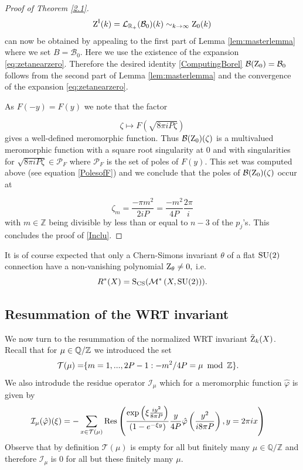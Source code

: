 \begin{proof}[Proof of Theorem \ref{2.1}]
  $$\operatorname{Z}^{\operatorname{I}}(k)= \mathcal{L}_{\mathbb{R}_+} (\mathcal{B}_0)(k) \sim_{k \rightarrow \infty}  \operatorname{Z}_0(k) $$ can now be obtained by appealing to the first part of Lemma \ref{lem:masterlemma} where we set $B=\mathcal{B}_0$. Here we use the existence of the expansion \eqref{eq:zetanearzero}. Therefore the desired identity  \eqref{ComputingBorel}  $\mathcal{B}(\operatorname{Z}_0)=\mathcal{B}_0$ follows from the second part of Lemma \ref{lem:masterlemma} and the convergence of the expansion \eqref{eq:zetanearzero}. 

  As $F(-y)=F(y)$ we note that the factor
  
   $$\zeta \mapsto F\left(\sqrt{8\pi iP\zeta}\right)$$
    gives a well-defined meromorphic function. Thus $\mathcal{B}(\operatorname{Z}_{0})(\zeta)$ is a multivalued meromorphic function with a square root singularity at $0$ and with  singularities for $\sqrt{8\pi iP\zeta} \in  \mathcal{P}_F$ where $\mathcal{P}_F$ is the set of poles of $F(y).$ This set was computed above (see equation \eqref{PolesofF}) and we conclude that the poles of  $\mathcal{B}(\operatorname{Z}_{0})(\zeta)$ occur at
    
$$\zeta_m=\frac{ -\pi  m^2}{2iP}=\frac{- m^2}{4P} \frac{2\pi }{i}$$ with $m\in \mathbb{Z}$ being divisible by less than or equal to $n-3$ of the $p_j$'s.  This concludes the proof of \eqref{Inclu}.
 \end{proof}
 
  It is of course expected that only a Chern-Simons invariant $\theta$ of a flat $\operatorname{SU}(2)$ connection have a non-vanishing polynomial $\operatorname{Z}_{\theta} \not=0,$ i.e. $$R^*(X)=\operatorname{S_{CS}}(\mathcal{M}^*\left(X,\operatorname{SU}(2)\right) ).$$ 





\subsection{Resummation of the WRT invariant}
We now turn to the resummation of the normalized WRT invariant $\tilde{\operatorname{Z}}_k(X)$. Recall that for $\mu \in \mathbb{Q}/ \mathbb{Z}$ we introduced the set
\begin{align}\label{R}
\mathcal{T}(\mu) = & \{m=1,...,2P -1 :-m^2/4P=\mu \ \modu \ \mathbb{Z} \}.
\end{align}
We also introdude the residue operator $\mathcal{I}_\mu$ which for a meromorphic function $\hat{\varphi}$ is given by
\begin{align}  \label{Lmu}  \mathcal{I}_{\mu}(\hat{\varphi})(\xi) = -& \sum_{x \in \mathcal{T}(\mu)} \operatorname{Res} \left (\frac{\exp\left(\xi \frac{iy^2}{8\pi P}\right)}{(1-e^{-\xi y})} \frac{y}{ 4P}\hat{\varphi}\left(\frac{y^2}{i8\pi P }\right) , y=2\pi i x\right)\end{align}
Observe that by definition $\mathcal{T}(\mu)$ is empty for all but finitely many $\mu \in \mathbb{Q} / \mathbb{Z}$ and therefore $\mathcal{I}_{\mu}$ is $0$ for all but these finitely many $\mu.$


